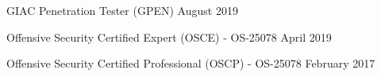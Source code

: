 \begin{cvhonors}
      \cvhonor
    {} %
    {GIAC Penetration Tester (GPEN)} %
    {} %
    {August 2019} %

      \cvhonor
    {} %
    {Offensive Security Certified Expert (OSCE) - OS-25078} %
    {} %
    {April 2019} %


      \cvhonor
    {} %
    {Offensive Security Certified Professional (OSCP) - OS-25078} %
    {} %
    {February 2017} %



\end{cvhonors}


